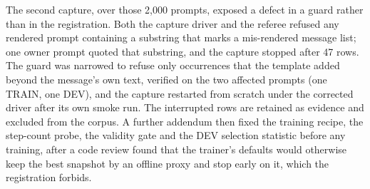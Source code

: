 \documentclass[
  11pt,
]{article}
\begin{document}
The second capture, over those 2,000 prompts, exposed a defect in a
guard rather than in the registration. Both the capture driver and the
referee refused any rendered prompt containing a substring that marks a
mis-rendered message list; one owner prompt quoted that substring, and
the capture stopped after 47 rows. The guard was narrowed to refuse only
occurrences that the template added beyond the message's own text,
verified on the two affected prompts (one TRAIN, one DEV), and the
capture restarted from scratch under the corrected driver after its own
smoke run. The interrupted rows are retained as evidence and excluded
from the corpus. A further addendum then fixed the training recipe, the
step-count probe, the validity gate and the DEV selection statistic
before any training, after a code review found that the trainer's
defaults would otherwise keep the best snapshot by an offline proxy and
stop early on it, which the registration forbids.
\end{document}
